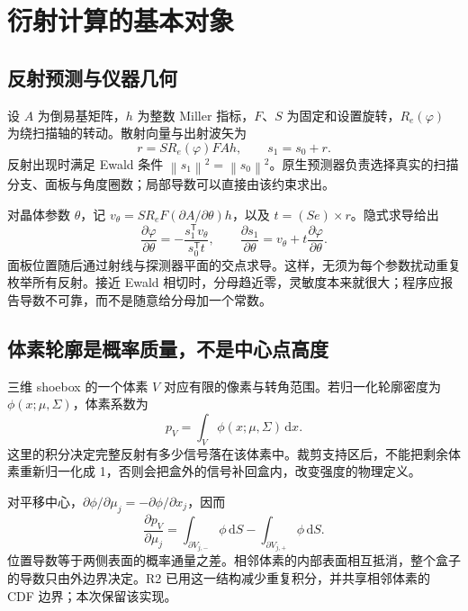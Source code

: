 \documentclass[UTF8,11pt,a4paper,fontset=fandol]{ctexart}
\newcommand{\T}{^{\mathsf T}}
\newcommand{\norm}[1]{\left\lVert#1\right\rVert}
\begin{document}
\section{衍射计算的基本对象}
\subsection{反射预测与仪器几何}

设 $A$ 为倒易基矩阵，$h$ 为整数 Miller 指标，$F$、$S$ 为固定和设置旋转，$R_e(\varphi)$ 为绕扫描轴的转动。散射向量与出射波矢为
\begin{equation}
 r=S R_e(\varphi)F A h,\qquad s_1=s_0+r.
\end{equation}
反射出现时满足 Ewald 条件 $\norm{s_1}^2=\norm{s_0}^2$。原生预测器负责选择真实的扫描分支、面板与角度圈数；局部导数可以直接由该约束求出\cite{geometry}。

对晶体参数 $\theta$，记 $v_\theta=S R_e F(\partial A/\partial\theta)h$，以及 $t=(Se)\times r$。隐式求导给出
\begin{equation}
 \frac{\partial\varphi}{\partial\theta}
 =-\frac{s_1\T v_\theta}{s_0\T t},\qquad
 \frac{\partial s_1}{\partial\theta}
 =v_\theta+t\frac{\partial\varphi}{\partial\theta}.
\end{equation}
面板位置随后通过射线与探测器平面的交点求导。这样，无须为每个参数扰动重复枚举所有反射。接近 Ewald 相切时，分母趋近零，灵敏度本来就很大；程序应报告导数不可靠，而不是随意给分母加一个常数。

\subsection{体素轮廓是概率质量，不是中心点高度}

三维 shoebox 的一个体素 $V$ 对应有限的像素与转角范围。若归一化轮廓密度为 $\phi(x;\mu,\Sigma)$，体素系数为
\begin{equation}
 p_V=\int_V\phi(x;\mu,\Sigma)\,\mathrm dx.
\end{equation}
这里的积分决定完整反射有多少信号落在该体素中。裁剪支持区后，不能把剩余体素重新归一化成 1，否则会把盒外的信号补回盒内，改变强度的物理定义。

对平移中心，$\partial\phi/\partial\mu_j=-\partial\phi/\partial x_j$，因而
\begin{equation}
 \frac{\partial p_V}{\partial\mu_j}
 =\int_{\partial V_{j,-}}\phi\,\mathrm dS
 -\int_{\partial V_{j,+}}\phi\,\mathrm dS.
\end{equation}
位置导数等于两侧表面的概率通量之差。相邻体素的内部表面相互抵消，整个盒子的导数只由外边界决定。R2 已用这一结构减少重复积分，并共享相邻体素的 CDF 边界；本次保留该实现。
\end{document}
